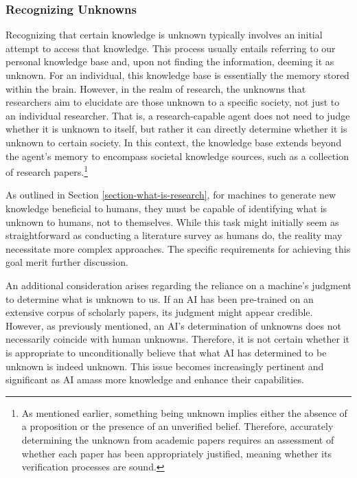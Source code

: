 \subsubsection{Recognizing Unknowns}
Recognizing that certain knowledge is unknown typically involves an initial attempt to access that knowledge. This process usually entails referring to our personal knowledge base and, upon not finding the information, deeming it as unknown. For an individual, this knowledge base is essentially the memory stored within the brain. However, in the realm of research, the unknowns that researchers aim to elucidate are those unknown to a specific society, not just to an individual researcher. That is, a research-capable agent does not need to judge whether it is unknown to itself, but rather it can directly determine whether it is unknown to certain society. In this context, the knowledge base extends beyond the agent's memory to encompass societal knowledge sources, such as a collection of research papers.\footnote{
As mentioned earlier, something being unknown implies either the absence of a proposition or the presence of an unverified belief. Therefore, accurately determining the unknown from academic papers requires an assessment of whether each paper has been appropriately justified, meaning whether its verification processes are sound.
}


As outlined in Section \ref{section-what-is-research}, for machines to generate new knowledge beneficial to humans, they must be capable of identifying what is unknown to humans, not to themselves. While this task might initially seem as straightforward as conducting a literature survey as humans do, the reality may necessitate more complex approaches. The specific requirements for achieving this goal merit further discussion.

An additional consideration arises regarding the reliance on a machine's judgment to determine what is unknown to us. If an AI has been pre-trained on an extensive corpus of scholarly papers, its judgment might appear credible. However, as previously mentioned, an AI's determination of unknowns does not necessarily coincide with human unknowns. Therefore, it is not certain whether it is appropriate to unconditionally believe that what AI has determined to be unknown is indeed unknown. This issue becomes increasingly pertinent and significant as AI amass more knowledge and enhance their capabilities.

